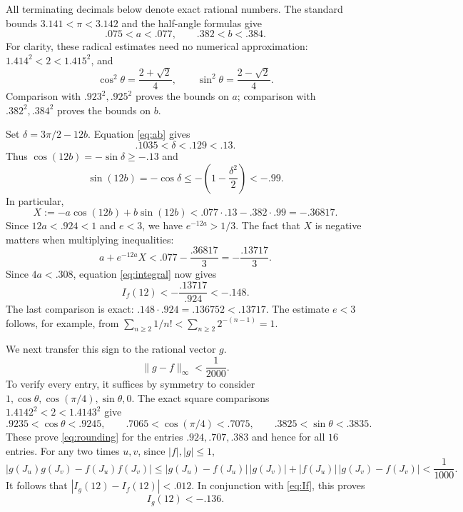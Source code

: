 \documentclass[11pt]{article}
\begin{document}
All terminating decimals below denote exact rational numbers. The
standard bounds $3.141<\pi<3.142$ and the half-angle formulas give
\begin{equation}\label{eq:ab}
 .075<a<.077,\qquad .382<b<.384.
\end{equation}
For clarity, these radical estimates need no numerical approximation:
$1.414^2<2<1.415^2$, and
\[
 \cos^2\theta=\frac{2+\sqrt2}{4},\qquad
 \sin^2\theta=\frac{2-\sqrt2}{4}.
\]
Comparison with $.923^2,.925^2$ proves the bounds on $a$;
comparison with $.382^2,.384^2$ proves the bounds on $b$.

Set $\delta=3\pi/2-12b$. Equation \eqref{eq:ab} gives
\[
 .1035<\delta<.129<.13.
\]
Thus $\cos(12b)=-\sin\delta\geq-.13$ and
\[
 \sin(12b)=-\cos\delta
 \leq-\left(1-\frac{\delta^2}{2}\right)<-.99.
\]
In particular,
\begin{equation}\label{eq:X}
 X:=-a\cos(12b)+b\sin(12b)
 <.077\cdot.13-.382\cdot.99=-.36817.
\end{equation}
Since $12a<.924<1$ and $e<3$, we have $e^{-12a}>1/3$.
The fact that $X$ is negative matters when multiplying inequalities:
\[
 a+e^{-12a}X<.077-\frac{.36817}{3}
 =-\frac{.13717}{3}.
\]
Since $4a<.308$, equation \eqref{eq:integral} now gives
\begin{equation}\label{eq:If}
 I_f(12)<-\frac{.13717}{.924}<-.148.
\end{equation}
The last comparison is exact: $.148\cdot.924=.136752<.13717$.
The estimate $e<3$ follows, for example, from
$\sum_{n\geq2}1/n!<\sum_{n\geq2}2^{-(n-1)}=1$.

We next transfer this sign to the rational vector $g$.
\begin{equation}\label{eq:rounding}
 \|g-f\|_\infty<\frac1{2000}.
\end{equation}
To verify every entry, it suffices by symmetry to consider
$1,\cos\theta,\cos(\pi/4),\sin\theta,0$.
The exact square comparisons $1.4142^2<2<1.4143^2$ give
\[
 .9235<\cos\theta<.9245,\qquad
 .7065<\cos(\pi/4)<.7075,\qquad
 .3825<\sin\theta<.3835.
\]
These prove \eqref{eq:rounding} for the entries $.924,.707,.383$
and hence for all $16$ entries.
For any two times $u,v$, since $|f|,|g|\leq1$,
\[
 |g(J_u)g(J_v)-f(J_u)f(J_v)|
 \leq |g(J_u)-f(J_u)|\,|g(J_v)|
      +|f(J_u)|\,|g(J_v)-f(J_v)|<\frac1{1000}.
\]
It follows that $|I_g(12)-I_f(12)|<.012$. In conjunction with
\eqref{eq:If}, this proves
\begin{equation}\label{eq:Ig}
 I_g(12)<-.136.
\end{equation}
\end{document}
